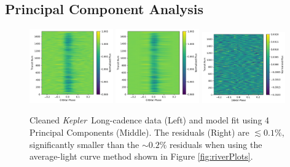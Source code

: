 \documentclass[preprint]{aastex61}
\newcommand{\kepler}{{\it Kepler}}
\begin{document}
\subsection{Principal Component Analysis}
\begin{figure}[!hbtp]
\begin{centering}
\includegraphics[width=0.32\textwidth]{images/kepler/photometry_riverplot.pdf}
\includegraphics[width=0.32\textwidth]{images/kepler/pca_model_2D.pdf}
\includegraphics[width=0.32\textwidth]{images/kepler/pca_resid_2D.pdf}
\caption{Cleaned \kepler\ Long-cadence data (Left) and model fit using 4 Principal Components (Middle).
The residuals (Right) are $\lesssim 0.1\%$, significantly smaller than the $\sim 0.2\%$ residuals when using the average-light curve method shown in Figure \ref{fig:riverPlots}.
}\label{fig:riverPlotsPCA}
\end{centering}
\end{figure}
\end{document}
